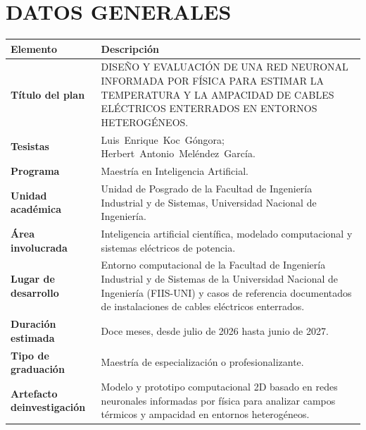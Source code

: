 \documentclass[11pt,a4paper,oneside]{report}
\newcommand{\tesisbodyfont}{\fontsize{11}{13.6}\selectfont}
\renewcommand{\arraystretch}{1.18}
\newcommand{\tituloTesis}{DISEÑO Y EVALUACIÓN DE UNA RED NEURONAL INFORMADA POR FÍSICA PARA ESTIMAR LA TEMPERATURA Y LA AMPACIDAD DE CABLES ELÉCTRICOS ENTERRADOS EN ENTORNOS HETEROGÉNEOS}
\begin{document}
\tesisbodyfont
\hypersetup{pageanchor=true}
\setcounter{page}{2}

\chapter*{DATOS GENERALES}
\vspace{0.35cm}

\begingroup
\singlespacing
\setlength{\parskip}{0pt}
\setlength{\parindent}{0pt}
\setlength{\tabcolsep}{10pt}
\renewcommand{\arraystretch}{1.28}
\noindent
\begin{tabularx}{\textwidth}{
  >{\bfseries\RaggedRight\setlength{\parindent}{0pt}\arraybackslash}p{4.15cm}
  J
}
\toprule
{}
\textbf{Elemento} & \textbf{Descripción} \\
\midrule
Título del plan & \tituloTesis. \\
\addlinespace[5pt]
Tesistas & \mbox{Luis Enrique Koc Góngora};\newline
           \mbox{Herbert Antonio Meléndez García}. \\
\addlinespace[5pt]
Programa & Maestría en Inteligencia Artificial. \\
\addlinespace[5pt]
Unidad académica & Unidad de Posgrado de la Facultad de Ingeniería Industrial y de Sistemas, Universidad Nacional de Ingeniería. \\
\addlinespace[5pt]
Área involucrada & Inteligencia artificial científica, modelado computacional y sistemas eléctricos de potencia. \\
\addlinespace[5pt]
Lugar de desarrollo & Entorno computacional de la Facultad de Ingeniería Industrial y de Sistemas de la Universidad Nacional de Ingeniería (FIIS-UNI) y casos de referencia documentados de instalaciones de cables eléctricos enterrados. \\
\addlinespace[5pt]
Duración estimada & Doce meses, desde julio de 2026 hasta junio de 2027. \\
\addlinespace[5pt]
Tipo de graduación & Maestría de especialización o profesionalizante. \\
\addlinespace[5pt]
Artefacto de\newline investigación & Modelo y prototipo computacional 2D basado en redes neuronales informadas por física para analizar campos térmicos y ampacidad en entornos heterogéneos. \\
\bottomrule
\end{tabularx}
\endgroup
\end{document}
